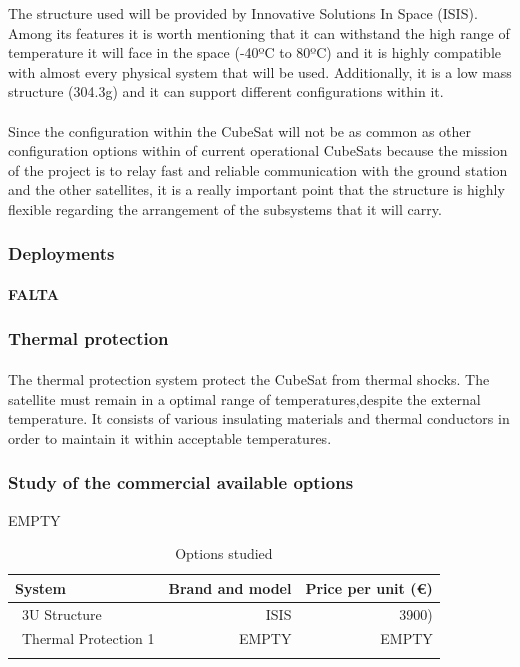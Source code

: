 The structure used will be provided by Innovative Solutions In Space (ISIS). Among its features it is worth mentioning that it can withstand the high range of temperature it will face in the space (-40ºC to 80ºC) and it is highly compatible with almost every physical system that will be used. Additionally, it is a low mass structure (304.3g) and it can support different configurations within it.

\paragraph{}Since the configuration within the CubeSat will not be as common as other configuration options within of current operational CubeSats because the mission of the project is to relay fast and reliable communication with the ground station and the other satellites, it is a really important point that the structure is highly flexible regarding the arrangement of the subsystems that it will carry.

\subsubsection{Deployments}

\paragraph{}\textbf{FALTA}


\subsubsection{Thermal protection}
\paragraph{}The thermal protection system protect the CubeSat from thermal shocks. The satellite must remain in a optimal range of temperatures,despite the external temperature. It consists of various insulating materials and thermal conductors in order to maintain it within acceptable temperatures.

\subsubsection{Study of the commercial available options}
EMPTY

\begin{longtable}{| l | r | r | }
\hline
\rowcolor[gray]{0.80}	\textbf{System} &  \textbf{Brand and model}     & \textbf{Price per unit (\euro)}   \\
\hline
\endfirsthead

	   ~3U Structure & ISIS & 3900) \\
	   ~Thermal Protection 1 & EMPTY & EMPTY \\
	\hline

\caption{Options studied}
\label{epsoptionstable}
\end{longtable}
